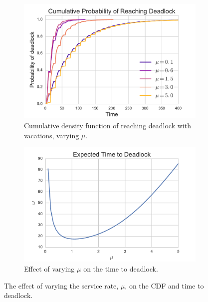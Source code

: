 \documentclass{article}
\begin{document}
\begin{figure}[!hbtp]
\begin{center}
\begin{subfigure}[b]{0.45\textwidth}
    \includegraphics[width=\textwidth]{img/cdf_vary_mu.pdf}
    \caption{Cumulative density function of reaching deadlock with vacations, varying $\mu$.}
    \label{fig:cdf_varymu}
\end{subfigure}
\begin{subfigure}[b]{0.45\textwidth}
    \includegraphics[width=\textwidth]{img/ttd_vary_mu.pdf}
    \caption{Effect of varying $\mu$ on the time to deadlock.}
    \label{fig:ttd_varymu}
\end{subfigure}
\end{center}
\caption{The effect of varying the service rate, $\mu$, on the CDF and time to deadlock.}
\label{fig:ttdcdf_varymu}
\end{figure}
\end{document}
